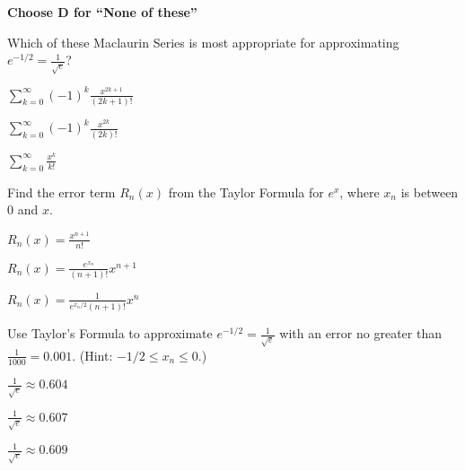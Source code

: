 \documentclass[12pt]{exam}
\newcommand{\<}{\langle}
\renewcommand{\>}{\rangle}
\begin{document}
\begin{center}
\end{center}
\vspace{0.1in}

\vspace{12pt}

\textbf{Choose D for ``None of these''}

\begin{questions}\setcounter{question}{47}

\question
Which of these Maclaurin Series is most appropriate for approximating
\(e^{-1/2}=\frac{1}{\sqrt e}\)?
\begin{choices}
\item \(\sum_{k=0}^\infty(-1)^k\frac{x^{2k+1}}{(2k+1)!}\)
\item \(\sum_{k=0}^\infty(-1)^k\frac{x^{2k}}{(2k)!}\)
\item \(\sum_{k=0}^\infty\frac{x^k}{k!}\)
\end{choices}

\question
Find the error term \(R_n(x)\) from the Taylor Formula for \(e^x\),
where \(x_n\) is between \(0\) and \(x\).
\begin{choices}
\item \(R_n(x)=\frac{x^{n+1}}{n!}\)
\item \(R_n(x)=\frac{e^{x_n}}{(n+1)!}x^{n+1}\)
\item \(R_n(x)=\frac{1}{e^{x_n/2}(n+1)!}x^n\)
\end{choices}

\question
Use Taylor's Formula to
approximate \(e^{-1/2}=\frac{1}{\sqrt e}\) with an error no greater than
\(\frac{1}{1000}=0.001\). (Hint: \(-1/2\leq x_n\leq 0\).)
\begin{choices}
\item \(\frac{1}{\sqrt e}\approx 0.604\)
\item \(\frac{1}{\sqrt e}\approx 0.607\)
\item \(\frac{1}{\sqrt e}\approx 0.609\)
\end{choices}

\end{questions}
\end{document}
